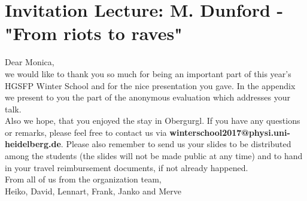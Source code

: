 \documentclass[11pt,a4paper]{article}
\begin{document}
\section*{Invitation Lecture: M. Dunford  - "From riots to raves"}

Dear Monica,\\
we would like to thank you so much for being an important part of this year's HGSFP Winter School and for the nice presentation you gave.
In the appendix we present to you the part of the anonymous evaluation which addresses your talk.\\
Also we hope, that you enjoyed the stay in Obergurgl. If you have any questions or remarks, please feel free to contact us via \textbf{winterschool2017@physi.uni-heidelberg.de}. Please also remember to send us your slides to be distributed among the students (the slides will not be made public at any time) and to hand in your travel reimbursement documents, if not already happened.\\
From all of us from the organization team,\\
Heiko, David, Lennart, Frank, Janko and Merve
\end{document}
